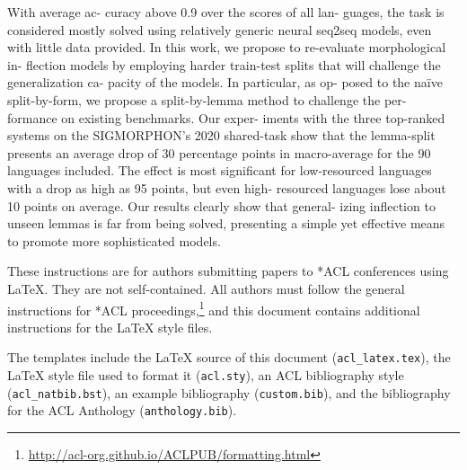 \documentclass[11pt]{article}
\begin{document}
With average ac- curacy above 0.9 over the scores of all lan- guages, the task is considered mostly solved using relatively generic neural seq2seq models, even with little data provided. In this work, we propose to re-evaluate morphological in- flection models by employing harder train-test splits that will challenge the generalization ca- pacity of the models. In particular, as op- posed to the naïve split-by-form, we propose a split-by-lemma method to challenge the per- formance on existing benchmarks. Our exper- iments with the three top-ranked systems on the SIGMORPHON’s 2020 shared-task show that the lemma-split presents an average drop of 30 percentage points in macro-average for the 90 languages included. The effect is most significant for low-resourced languages with a drop as high as 95 points, but even high- resourced languages lose about 10 points on average. Our results clearly show that general- izing inflection to unseen lemmas is far from being solved, presenting a simple yet effective means to promote more sophisticated models.





These instructions are for authors submitting papers to *ACL conferences using \LaTeX. They are not self-contained. All authors must follow the general instructions for *ACL proceedings,\footnote{\url{http://acl-org.github.io/ACLPUB/formatting.html}} and this document contains additional instructions for the \LaTeX{} style files.

The templates include the \LaTeX{} source of this document (\texttt{acl\_latex.tex}),
the \LaTeX{} style file used to format it (\texttt{acl.sty}),
an ACL bibliography style (\texttt{acl\_natbib.bst}),
an example bibliography (\texttt{custom.bib}),
and the bibliography for the ACL Anthology (\texttt{anthology.bib}).


%

%
%
\end{document}
